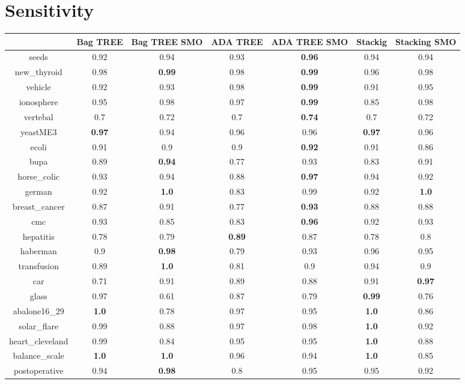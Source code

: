 \documentclass{article}%
\begin{document}
%
\section*{Sensitivity}%
\begin{tabular}{c|cccccc}%
&Bag TREE&Bag TREE SMO&ADA TREE&ADA TREE SMO&Stackig&Stacking SMO\\%
\hline%
seeds&0.92&0.94&0.93&\textbf{0.96}&0.94&0.94\\%
new\_thyroid&0.98&\textbf{0.99}&0.98&\textbf{0.99}&0.96&0.98\\%
vehicle&0.92&0.93&0.98&\textbf{0.99}&0.91&0.95\\%
ionosphere&0.95&0.98&0.97&\textbf{0.99}&0.85&0.98\\%
vertebal&0.7&0.72&0.7&\textbf{0.74}&0.7&0.72\\%
yeastME3&\textbf{0.97}&0.94&0.96&0.96&\textbf{0.97}&0.96\\%
ecoli&0.91&0.9&0.9&\textbf{0.92}&0.91&0.86\\%
bupa&0.89&\textbf{0.94}&0.77&0.93&0.83&0.91\\%
horse\_colic&0.93&0.94&0.88&\textbf{0.97}&0.94&0.92\\%
german&0.92&\textbf{1.0}&0.83&0.99&0.92&\textbf{1.0}\\%
breast\_cancer&0.87&0.91&0.77&\textbf{0.93}&0.88&0.88\\%
cmc&0.93&0.85&0.83&\textbf{0.96}&0.92&0.93\\%
hepatitis&0.78&0.79&\textbf{0.89}&0.87&0.78&0.8\\%
haberman&0.9&\textbf{0.98}&0.79&0.93&0.96&0.95\\%
transfusion&0.89&\textbf{1.0}&0.81&0.9&0.94&0.9\\%
car&0.71&0.91&0.89&0.88&0.91&\textbf{0.97}\\%
glass&0.97&0.61&0.87&0.79&\textbf{0.99}&0.76\\%
abalone16\_29&\textbf{1.0}&0.78&0.97&0.95&\textbf{1.0}&0.86\\%
solar\_flare&0.99&0.88&0.97&0.98&\textbf{1.0}&0.92\\%
heart\_cleveland&0.99&0.84&0.95&0.95&\textbf{1.0}&0.88\\%
balance\_scale&\textbf{1.0}&\textbf{1.0}&0.96&0.94&\textbf{1.0}&0.85\\%
postoperative&0.94&\textbf{0.98}&0.8&0.95&0.95&0.92\\%
\end{tabular}

%
\end{document}
